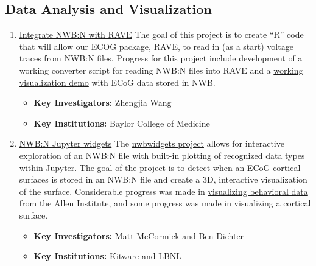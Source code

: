 \documentclass{article}
\begin{document}
\begin{enumerate}
    \setcounter{projectEnumCounter}{\theenumi}
\end{enumerate}

\subsection{Data Analysis and Visualization}

\begin{enumerate}
    \setcounter{enumi}{\theprojectEnumCounter}  %
    \item \href{https://neurodatawithoutborders.github.io/nwb_hackathons/HCK06_2019_Janelia/projects/RAVE/}{Integrate NWB:N with RAVE}  The goal of this project is to create “R” code that will allow our ECOG package, RAVE, to read in (as a start) voltage traces from NWB:N files. Progress for this project include development of a working converter script for reading NWB:N files into RAVE and a \href{https://youtu.be/h_W9FyHKokA}{working visualization demo} with ECoG data stored in NWB.
        \vspace{-0.2cm}
        \begin{itemize}[noitemsep]
            \item \textbf{Key Investigators:} Zhengjia Wang
            \item \textbf{Key Institutions:} Baylor College of Medicine
        \end{itemize}

    \item \href{https://neurodatawithoutborders.github.io/nwb_hackathons/HCK06_2019_Janelia/projects/JupyterWidgets/}{NWB:N Jupyter widgets} The \href{https://github.com/NeurodataWithoutBorders/nwb-jupyter-widgets/}{nwbwidgets project} allows for interactive exploration of an NWB:N file with built-in plotting of recognized data types within Jupyter. The goal of the project is to detect when an ECoG cortical surfaces is stored in an NWB:N file and create a 3D, interactive visualization of the surface. Considerable progress was made in \href{https://camo.githubusercontent.com/6409f891a8591f2799b4d8cbfb4899cf2014bc52/68747470733a2f2f692e696d6775722e636f6d2f423939676838312e676966}{visualizing behavioral data} from the Allen Institute, and some progress was made in visualizing a cortical surface. 
        \vspace{-0.2cm}
        \begin{itemize}[noitemsep]
            \item \textbf{Key Investigators:} Matt McCormick and Ben Dichter
            \item \textbf{Key Institutions:} Kitware and LBNL
        \end{itemize}
        

\end{enumerate}
\end{document}

